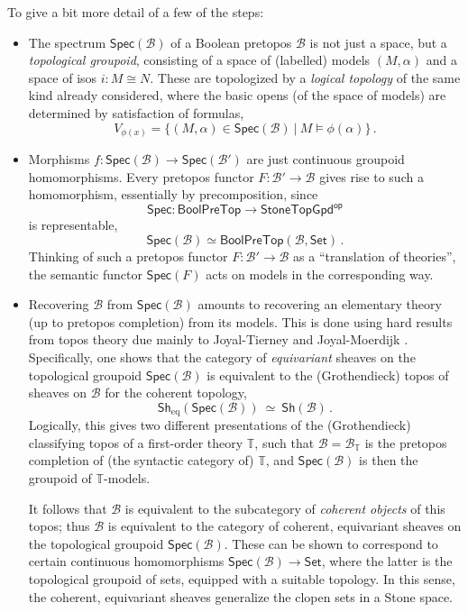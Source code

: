 \documentclass[graybox]{svmult}
\newcommand{\T}{\ensuremath{\mathbb{T}}}
\newcommand{\Set}{\ensuremath{\mathsf{Set}}}
\begin{document}
To give a bit more detail of a few of the steps:
\begin{itemize}
\item The spectrum $\mathsf{Spec}(\mathcal{B})$ of a Boolean pretopos $\mathcal{B}$ is not just a space, but a \emph{topological groupoid}, consisting of a space of (labelled) models $(M,\alpha)$ and a space of isos $i : M \cong N$.  These are topologized by a \emph{logical topology} of the same kind already considered, where the basic opens (of the space of models) are determined by satisfaction of formulas, $$V_{\phi(x)} = \{ (M,\alpha)\in \mathsf{Spec}(\mathcal{B})\ |\ M\models \phi(\alpha)\}\,.$$

\item Morphisms $f : \mathsf{Spec}(\mathcal{B}) \to \mathsf{Spec}(\mathcal{B'})$ are just continuous groupoid homomorphisms.  Every pretopos functor $F : \mathcal{B'} \to \mathcal{B}$ gives rise to such a homomorphism, essentially by precomposition, since 
$$\mathsf{Spec} : \mathsf{BoolPreTop} \to \mathsf{StoneTopGpd}^{\mathsf{op}}$$ 
is representable,
\[
\mathsf{Spec}(\mathcal{B}) \simeq \mathsf{BoolPreTop}(\mathcal{B}, \Set)\,.
\]
Thinking of such a pretopos functor $F :\mathcal{B'} \to \mathcal{B}$ as a ``translation of theories'', the semantic functor $\mathsf{Spec}(F)$ acts on models in the corresponding way.

\item Recovering $\mathcal{B}$ from $\mathsf{Spec}(\mathcal{B})$ amounts to recovering an elementary theory (up to pretopos completion) from its models.  This is done using hard results from topos theory due mainly to Joyal-Tierney and Joyal-Moerdijk \cite{JT,JM,BM}. Specifically, one shows that the category
of \emph{equivariant} sheaves on the topological groupoid $\mathsf{Spec}(\mathcal{B})$ is equivalent to the (Grothendieck) topos of sheaves on $\mathcal{B}$ for the coherent topology,
\[
\mathsf{Sh}_{\mathrm{eq}}(\mathsf{Spec}(\mathcal{B}))\ \simeq\ \mathsf{Sh}(\mathcal{B})\,.
\]
Logically, this gives two different presentations of the (Grothendieck) classifying topos of a first-order theory $\T$, such that $\mathcal{B} = \mathcal{B}_\T$ is the pretopos completion of (the syntactic category of) $\T$, and  $\mathsf{Spec}(\mathcal{B})$ is then the groupoid of $\T$-models.

It follows that $\mathcal{B}$ is equivalent to the subcategory of \emph{coherent objects} of this topos; thus $\mathcal{B}$ is equivalent to the category of coherent, equivariant sheaves on the topological groupoid $\mathsf{Spec}(\mathcal{B})$.  
These can be shown to correspond to certain continuous homomorphisms $\mathsf{Spec}(\mathcal{B}) \rightarrow \Set$, where the latter is the topological groupoid of sets, equipped with a suitable topology.  In this sense, the coherent, equivariant sheaves generalize the clopen sets in a Stone space.

\end{itemize}
\end{document}

